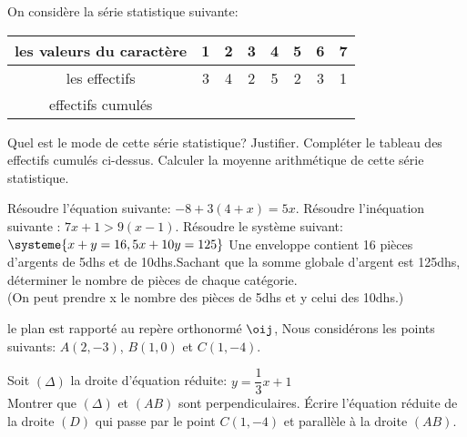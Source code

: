 \documentclass[a4paper,addpoints,12pt]{exam}
\begin{document}
\begin{exo}
On considère la série statistique suivante:
\begin{tabular}{|c|c|c|c|c|c|c|c|}
\hline 
les valeurs du caractère & 1 & 2 & 3 & 4 & 5 & 6 & 7 \\ 
\hline 
les effectifs & 3 & 4 & 2 & 5 & 2 & 3 & 1 \\ 
\hline 
effectifs cumulés &  &  &  &  &  &  &  \\ 
\hline 
\end{tabular} 
\begin{questions}
\question Quel est le mode de cette série statistique? Justifier.
\question Compléter le tableau des effectifs cumulés ci-dessus.
\question Calculer la moyenne arithmétique de cette série statistique.
\end{questions}
\end{exo}

\begin{exo}
\begin{questions}
\question Résoudre l'équation suivante: $-8+3(4+x)=5x$.
\question Résoudre l'inéquation suivante : $7x+1 > 9(x-1)$.
\question Résoudre le système suivant:
$\systeme{x+y=16, 5x+10y=125}$
\question Une enveloppe contient 16 pièces d'argents de 5dhs et de 10dhs.Sachant que la somme globale d'argent est 125dhs, déterminer le nombre de pièces de chaque catégorie.\\
(On peut prendre x le nombre des pièces de 5dhs et y celui des 10dhs.)
\end{questions}
\end{exo}

\begin{exo}
le plan est rapporté au repère orthonormé $\oij$, Nous considérons les points suivants: $A(2,-3)$, $B(1,0)$ et $C(1,-4)$.
\begin{questions}
\question
{}
\question Soit $(\Delta)$ la droite d'équation réduite: $y=\dfrac{1}{3}x+1$\\
Montrer que $(\Delta)$ et $(AB)$ sont perpendiculaires.
\question \'Ecrire l'équation réduite de la droite $(D)$ qui passe par le point $C(1,-4)$ et parallèle à la droite $(AB)$.
\end{questions}
\end{exo}
 
\end{document}
